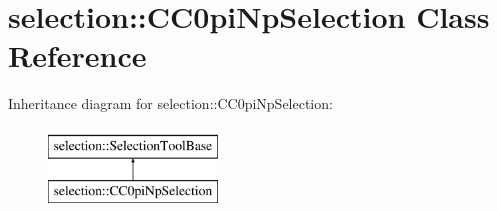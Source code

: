 \hypertarget{classselection_1_1CC0piNpSelection}{}\section{selection\+:\+:C\+C0pi\+Np\+Selection Class Reference}
\label{classselection_1_1CC0piNpSelection}
Inheritance diagram for selection\+:\+:C\+C0pi\+Np\+Selection\+:\begin{figure}[H]
\begin{center}
\leavevmode
\includegraphics[height=2.000000cm]{classselection_1_1CC0piNpSelection}
\end{center}
\end{figure}
